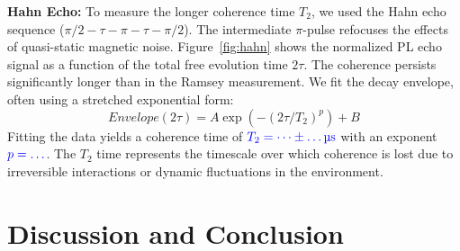 \documentclass[aps,prb,twocolumn,superscriptaddress,floatfix,longbibliography,citeautoscript]{revtex4-2}
\begin{document}
\textbf{Hahn Echo:} To measure the longer coherence time $T_2$, we used the Hahn echo sequence ($\pi/2 - \tau - \pi - \tau - \pi/2$).
The intermediate $\pi$-pulse refocuses the effects of quasi-static magnetic noise.
Figure~\ref{fig:hahn} shows the normalized PL echo signal as a function of the total free evolution time $2\tau$.
The coherence persists significantly longer than in the Ramsey measurement.
We fit the decay envelope, often using a stretched exponential form:
\begin{equation}
    Envelope(2\tau) = A \exp(-(2\tau/T_2)^p) + B
    \label{eq:hahn_fit}
\end{equation}
Fitting the data yields a coherence time of $\textcolor{blue}{T_2 = \dots \pm \dots \si{\micro\second}}$ with an exponent $\textcolor{blue}{p = \dots}$.
The $T_2$ time represents the timescale over which coherence is lost due to irreversible interactions or dynamic fluctuations in the environment.

\section{\label{sec:discussion_conclusion}Discussion and Conclusion} %
\end{document}
